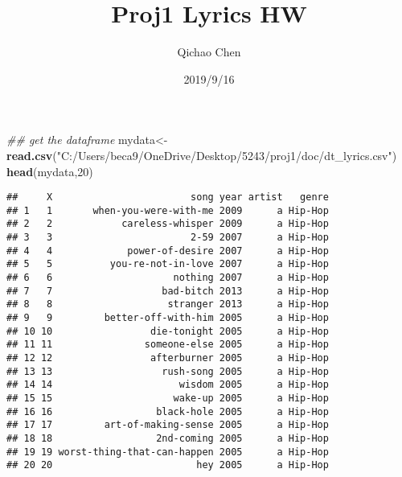 \documentclass[]{article}
\title{Proj1 Lyrics HW}
\author{Qichao Chen}
\date{2019/9/16}
\newenvironment{Shaded}{\begin{snugshade}}{\end{snugshade}}
\newcommand{\CommentTok}[1]{\textcolor[rgb]{0.56,0.35,0.01}{\textit{#1}}}
\newcommand{\DecValTok}[1]{\textcolor[rgb]{0.00,0.00,0.81}{#1}}
\newcommand{\KeywordTok}[1]{\textcolor[rgb]{0.13,0.29,0.53}{\textbf{#1}}}
\newcommand{\NormalTok}[1]{#1}
\newcommand{\StringTok}[1]{\textcolor[rgb]{0.31,0.60,0.02}{#1}}
\begin{document}
\maketitle

\begin{Shaded}
\begin{Highlighting}[]
\CommentTok{## get the dataframe}
\NormalTok{mydata<-}\KeywordTok{read.csv}\NormalTok{(}\StringTok{"C:/Users/beca9/OneDrive/Desktop/5243/proj1/doc/dt_lyrics.csv"}\NormalTok{)}
\KeywordTok{head}\NormalTok{(mydata,}\DecValTok{20}\NormalTok{)}
\end{Highlighting}
\end{Shaded}

\begin{verbatim}
##     X                        song year artist   genre
## 1   1       when-you-were-with-me 2009      a Hip-Hop
## 2   2            careless-whisper 2009      a Hip-Hop
## 3   3                        2-59 2007      a Hip-Hop
## 4   4             power-of-desire 2007      a Hip-Hop
## 5   5          you-re-not-in-love 2007      a Hip-Hop
## 6   6                     nothing 2007      a Hip-Hop
## 7   7                   bad-bitch 2013      a Hip-Hop
## 8   8                    stranger 2013      a Hip-Hop
## 9   9         better-off-with-him 2005      a Hip-Hop
## 10 10                 die-tonight 2005      a Hip-Hop
## 11 11                someone-else 2005      a Hip-Hop
## 12 12                 afterburner 2005      a Hip-Hop
## 13 13                   rush-song 2005      a Hip-Hop
## 14 14                      wisdom 2005      a Hip-Hop
## 15 15                     wake-up 2005      a Hip-Hop
## 16 16                  black-hole 2005      a Hip-Hop
## 17 17         art-of-making-sense 2005      a Hip-Hop
## 18 18                  2nd-coming 2005      a Hip-Hop
## 19 19 worst-thing-that-can-happen 2005      a Hip-Hop
## 20 20                         hey 2005      a Hip-Hop

\end{verbatim}
\end{document}
